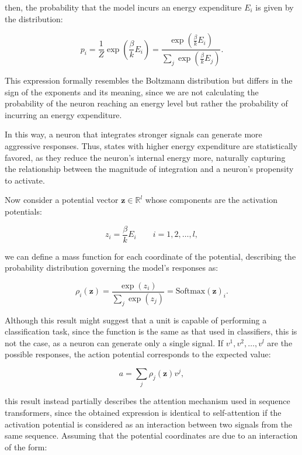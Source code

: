 \documentclass[12pt]{article}
\begin{document}
then, the probability that the model incurs an energy expenditure $E_i$ is given by the distribution:

\begin{equation}
p_i = \frac{1}{Z} \exp\left(\frac{\beta}{k} E_i\right) = \frac{\exp(\frac{\beta}{k} E_i)}{\sum_j \exp(\frac{\beta}{k} E_j)}  .
\end{equation}

This expression formally resembles the Boltzmann distribution but differs in the sign of the exponents and its meaning, since we are not calculating the probability of the neuron reaching an energy level but rather the probability of incurring an energy expenditure.

In this way, a neuron that integrates stronger signals can generate more aggressive responses. Thus, states with higher energy expenditure are statistically favored, as they reduce the neuron’s internal energy more, naturally capturing the relationship between the magnitude of integration and a neuron’s propensity to activate.

Now consider a potential vector $\mathbf{z} \in \mathbb{R}^l$ whose components are the activation potentials:

\begin{equation}
z_i = \frac{\beta}{k} E_i \qquad i = 1, 2, \dots, l  ,
\end{equation}

we can define a mass function for each coordinate of the potential, describing the probability distribution governing the model’s responses as:

\begin{equation}
\rho_i(\mathbf{z}) = \frac{\exp(z_i)}{\sum_j \exp(z_j)} = \text{Softmax}(\mathbf{z})_i.
\end{equation}

Although this result might suggest that a unit is capable of performing a classification task, since the function is the same as that used in classifiers, this is not the case, as a neuron can generate only a single signal. If $v^1, v^2, \dots, v^l$ are the possible responses, the action potential corresponds to the expected value:

\begin{equation}
a = \sum_j \rho_j(\mathbf{z}) v^j,
\end{equation}

this result instead partially describes the attention mechanism used in sequence transformers, since the obtained expression is identical to self-attention if the activation potential is considered as an interaction between two signals from the same sequence. Assuming that the potential coordinates are due to an interaction of the form:
\end{document}
